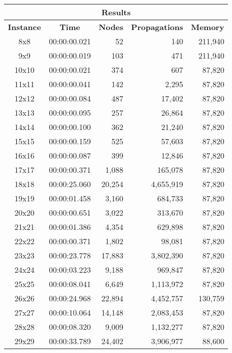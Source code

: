 
\begin{center}
    \begin{tabular}{|c|c|r|r|r|}
        \hline
        \multicolumn{5}{|c|}{\textbf{Results}} \\
        \hline
        \textbf{Instance} & \textbf{Time} & \textbf{Nodes} & \textbf{Propagations} & \textbf{Memory} \\
        
        \hline
		8x8 & 00:00:00.021 & 52 & 140 & 211,940 \\ \hline
		9x9 & 00:00:00.019 & 103 & 471 & 211,940 \\ \hline
		10x10 & 00:00:00.021 & 374 & 607 & 87,820 \\ \hline
		11x11 & 00:00:00.041 & 142 & 2,295 & 87,820 \\ \hline
		12x12 & 00:00:00.084 & 487 & 17,402 & 87,820 \\ \hline
		13x13 & 00:00:00.095 & 257 & 26,864 & 87,820 \\ \hline
		14x14 & 00:00:00.100 & 362 & 21,240 & 87,820 \\ \hline
		15x15 & 00:00:00.159 & 525 & 57,603 & 87,820 \\ \hline
		16x16 & 00:00:00.087 & 399 & 12,846 & 87,820 \\ \hline
		17x17 & 00:00:00.371 & 1,088 & 165,078 & 87,820 \\ \hline
		18x18 & 00:00:25.060 & 20,254 & 4,655,919 & 87,820 \\ \hline
		19x19 & 00:00:01.458 & 3,160 & 684,733 & 87,820 \\ \hline
		20x20 & 00:00:00.651 & 3,022 & 313,670 & 87,820 \\ \hline
		21x21 & 00:00:01.386 & 4,354 & 629,898 & 87,820 \\ \hline
		22x22 & 00:00:00.371 & 1,802 & 98,081 & 87,820 \\ \hline
		23x23 & 00:00:23.778 & 17,883 & 3,802,390 & 87,820 \\ \hline
		24x24 & 00:00:03.223 & 9,188 & 969,847 & 87,820 \\ \hline
		25x25 & 00:00:08.041 & 6,649 & 1,113,972 & 87,820 \\ \hline
		26x26 & 00:00:24.968 & 22,894 & 4,452,757 & 130,759 \\ \hline
		27x27 & 00:00:10.064 & 14,148 & 2,083,453 & 87,820 \\ \hline
		28x28 & 00:00:08.320 & 9,009 & 1,132,277 & 87,820 \\ \hline
		29x29 & 00:00:33.789 & 24,402 & 3,906,977 & 88,600 \\ \hline

\end{tabular}
\end{center}
